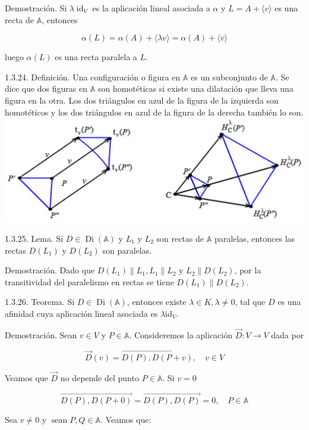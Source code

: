 \documentclass[12pt, a4paper, ones, notitlepage, openany,titlepage]{article}
\begin{document}
Demostración. Si $\lambda \operatorname{id}_{V}$ es la aplicación lineal asociada a $\alpha$ y $L=A+\langle v\rangle$ es una recta de $\mathbb{A}$, entonces

$$
\alpha(L)=\alpha(A)+\langle\lambda v\rangle=\alpha(A)+\langle v\rangle
$$

luego $\alpha(L)$ es una recta paralela a $L$.

1.3.24. Definición. Una configuración o figura en $\mathbb{A}$ es un subconjunto de $\mathbb{A}$. Se dice que dos figuras en $\mathbb{A}$ son homotéticas si existe una dilatación que lleva una figura en la otra. Los dos triángulos en azul de la figura de la izquierda son homotéticos y los dos triángulos en azul de la figura de la derecha también lo son.
\includegraphics[max width=\textwidth, center]{2023_03_01_7659aec5e35f9a9b2d3cg-30}

1.3.25. Lema. Si $D \in \operatorname{Di}(\mathbb{A})$ y $L_{1}$ y $L_{2}$ son rectas de $\mathbb{A}$ paralelas, entonces las rectas $D\left(L_{1}\right)$ y $D\left(L_{2}\right)$ son paralelas.

Demostración. Dado que $D\left(L_{1}\right)\left\|L_{1}, L_{1}\right\| L_{2}$ y $L_{2} \| D\left(L_{2}\right)$, por la transitividad del paralelismo en rectas se tiene $D\left(L_{1}\right) \| D\left(L_{2}\right)$.

1.3.26. Teorema. Si $D \in \operatorname{Di}(\mathbb{A})$, entonces existe $\lambda \in K, \lambda \neq 0$, tal que $D$ es una afinidad cuya aplicación lineal asociada es $\lambda \mathrm{id}_{V}$.

Demostración. Sean $v \in V$ y $P \in \mathbb{A}$. Consideremos la aplicación $\vec{D}: V \rightarrow V$ dada por

$$
\vec{D}(v)=\overrightarrow{D(P), D(P+v)}, \quad v \in V
$$

Veamos que $\vec{D}$ no depende del punto $P \in \mathbb{A}$. Si $v=0$

$$
\overrightarrow{D(P), D(P+0)}=\overrightarrow{D(P), D(P)}=0, \quad P \in \mathbb{A}
$$

Sea $v \neq 0$ y $\operatorname{sean} P, Q \in \mathbb{A}$. Veamos que:
\end{document}
